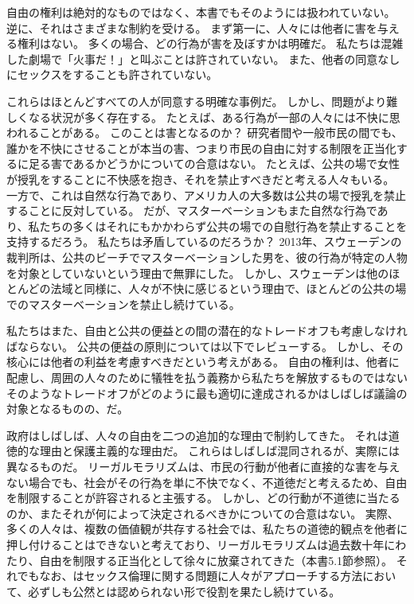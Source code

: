 \documentclass[paper=a4,book,openany]{jlreq} \usepackage{mystyle}
\begin{document}
自由の権利は絶対的なものではなく、本書でもそのようには扱われていない。
逆に、それはさまざまな制約を受ける。
まず第一に、人々には他者に害を与える権利はない。
多くの場合、どの行為が害を及ぼすかは明確だ。
私たちは混雑した劇場で「火事だ！」と叫ぶことは許されていない。
また、他者の同意なしにセックスをすることも許されていない。

これらはほとんどすべての人が同意する明確な事例だ。
しかし、問題がより難しくなる状況が多く存在する。
たとえば、ある行為が一部の人々には不快に思われることがある。
このことは害となるのか？ 研究者間や一般市民の間でも、誰かを不快にさせることが本当の害、つまり市民の自由に対する制限を正当化するに足る害であるかどうかについての合意はない。
たとえば、公共の場で女性が授乳をすることに不快感を抱き、それを禁止すべきだと考える人々もいる。
一方で、これは自然な行為であり、アメリカ人の大多数は公共の場で授乳を禁止することに反対している\citep{cdc08:_public_opinion_breas}。
だが、マスターベーションもまた自然な行為であり、私たちの多くはそれにもかかわらず公共の場での自慰行為を禁止することを支持するだろう。
私たちは矛盾しているのだろうか？ 2013年、スウェーデンの裁判所は、公共のビーチでマスターベーションした男を、彼の行為が特定の人物を対象としていないという理由で無罪にした\citep{ederyd13:_you_cant_just_walk_aroun}。
しかし、スウェーデンは他のほとんどの法域と同様に、人々が不快に感じるという理由で、ほとんどの公共の場でのマスターベーションを禁止し続けている。

私たちはまた、自由と公共の便益との間の潜在的なトレードオフも考慮しなければならない。
公共の便益の原則については以下でレビューする。
しかし、その核心には他者の利益を考慮すべきだという考えがある。
自由の権利は、他者に配慮し、周囲の人々のために犠牲を払う義務から私たちを解放するものではない{\DDASH}そのようなトレードオフがどのように最も適切に達成されるかはしばしば議論の対象となるものの、だ。

政府はしばしば、人々の自由を二つの追加的な理由で制約してきた。
それは道徳的な理由と保護主義的な理由だ。
これらはしばしば混同されるが、実際には異なるものだ。
リーガルモラリズムは、市民の行動が他者に直接的な害を与えない場合でも、社会がその行為を単に不快でなく、不道徳だと考えるため、自由を制限することが許容されると主張する。
しかし、どの行動が不道徳に当たるのか、またそれが何によって決定されるべきかについての合意はない。
実際、多くの人々は、複数の価値観が共存する社会では、私たちの道徳的観点を他者に押し付けることはできないと考えており、リーガルモラリズムは過去数十年にわたり、自由を制限する正当化として徐々に放棄されてきた（本書5.1節参照）。
それでもなお、はセックス倫理に関する問題に人々がアプローチする方法において、必ずしも公然とは認められない形で役割を果たし続けている。
\end{document}
